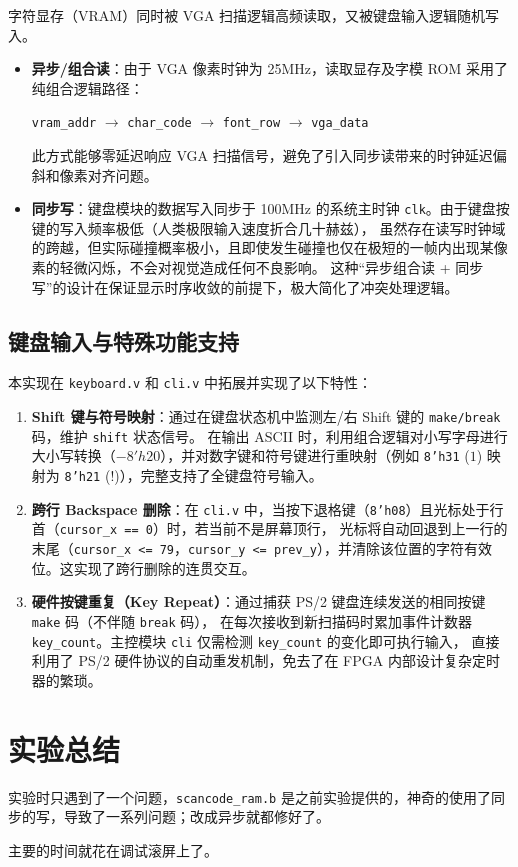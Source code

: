 \documentclass[12pt, a4paper]{ctexart}
\begin{document}
字符显存（VRAM）同时被 VGA 扫描逻辑高频读取，又被键盘输入逻辑随机写入。
\begin{itemize}
    \item \textbf{异步/组合读}：由于 VGA 像素时钟为 25MHz，读取显存及字模 ROM 采用了纯组合逻辑路径：
    \begin{center}
        \texttt{vram\_addr} $\to$ \texttt{char\_code} $\to$ \texttt{font\_row} $\to$ \texttt{vga\_data}
    \end{center}
    此方式能够零延迟响应 VGA 扫描信号，避免了引入同步读带来的时钟延迟偏斜和像素对齐问题。
    \item \textbf{同步写}：键盘模块的数据写入同步于 100MHz 的系统主时钟 \texttt{clk}。由于键盘按键的写入频率极低（人类极限输入速度折合几十赫兹），
    虽然存在读写时钟域的跨越，但实际碰撞概率极小，且即使发生碰撞也仅在极短的一帧内出现某像素的轻微闪烁，不会对视觉造成任何不良影响。
    这种“异步组合读 + 同步写”的设计在保证显示时序收敛的前提下，极大简化了冲突处理逻辑。
\end{itemize}

\subsection{键盘输入与特殊功能支持}

本实现在 \texttt{keyboard.v} 和 \texttt{cli.v} 中拓展并实现了以下特性：
\begin{enumerate}
    \item \textbf{Shift 键与符号映射}：通过在键盘状态机中监测左/右 Shift 键的 \texttt{make/break} 码，维护 \texttt{shift} 状态信号。
    在输出 ASCII 时，利用组合逻辑对小写字母进行大小写转换（$- 8'h20$），并对数字键和符号键进行重映射（例如 \texttt{8'h31} ($1$) 映射为 \texttt{8'h21} ($!$)），完整支持了全键盘符号输入。
    \item \textbf{跨行 Backspace 删除}：在 \texttt{cli.v} 中，当按下退格键（\texttt{8'h08}）且光标处于行首（\texttt{cursor\_x == 0}）时，若当前不是屏幕顶行，
    光标将自动回退到上一行的末尾（\texttt{cursor\_x <= 79}，\texttt{cursor\_y <= prev\_y}），并清除该位置的字符有效位。这实现了跨行删除的连贯交互。
    \item \textbf{硬件按键重复（Key Repeat）}：通过捕获 PS/2 键盘连续发送的相同按键 \texttt{make} 码（不伴随 \texttt{break} 码），
    在每次接收到新扫描码时累加事件计数器 \texttt{key\_count}。主控模块 \texttt{cli} 仅需检测 \texttt{key\_count} 的变化即可执行输入，
    直接利用了 PS/2 硬件协议的自动重发机制，免去了在 FPGA 内部设计复杂定时器的繁琐。
\end{enumerate}

\section{实验总结}

实验时只遇到了一个问题，\texttt{scancode\_ram.b} 是之前实验提供的，神奇的使用了同步的写，导致了一系列问题；改成异步就都修好了。

主要的时间就花在调试滚屏上了。
\end{document}
